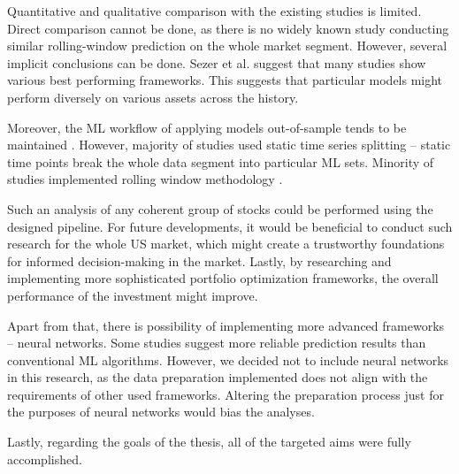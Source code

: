 Quantitative and qualitative comparison with the existing studies is limited. Direct comparison cannot be done, as there is no widely known study conducting similar rolling-window prediction on the whole market segment. However, several implicit conclusions can be done.
Sezer et al. \cite{review} suggest that many studies show various best performing frameworks. This suggests that particular models might perform diversely on various assets across the history.

Moreover, the ML workflow of applying models out-of-sample tends to be maintained \cite{krauss,review,zhao}. However, majority of studies used static time series splitting – static time points break the whole data segment into particular ML sets. Minority of studies implemented rolling window methodology \cite{review}. 
\newline
\par
Such an analysis of any coherent group of stocks could be performed using the designed pipeline. For future developments, it would be beneficial to conduct such research for the whole US market, which might 
create a trustworthy foundations for informed decision-making in the market. Lastly, by researching and implementing more sophisticated portfolio optimization frameworks, the overall performance of the investment 
might improve.

Apart from that, there is possibility of implementing more advanced frameworks – neural networks. Some studies \cite{review} suggest more reliable prediction results than conventional ML algorithms. However, we decided not to include neural networks in this research, as the data preparation implemented does not align with the requirements of other used frameworks. Altering the preparation process 
just for the purposes of neural networks would bias the analyses. 

Lastly, regarding the goals of the thesis, all of the targeted aims were fully accomplished.